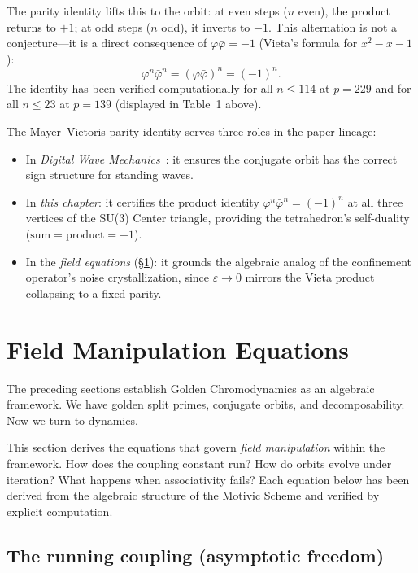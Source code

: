 The parity identity lifts this to the orbit:
at even steps ($n$ even), the product returns to $+1$;
at odd steps ($n$ odd), it inverts to $-1$.
This alternation is not a conjecture---it is a direct consequence
of $\varphi \bar\varphi = -1$ (Vieta's formula for $x^2 - x - 1$):
\[
\varphi^n \bar\varphi^n = (\varphi \bar\varphi)^n = (-1)^n.
\]
The identity has been verified computationally for all $n \leq 114$
at $p = 229$ and for all $n \leq 23$ at $p = 139$
(displayed in Table~1 above).

The Mayer--Vietoris parity identity serves three roles in the
paper lineage:
\begin{itemize}
\item In \emph{Digital Wave Mechanics}~\cite{lockwood_larue_dwm, dwm}: it ensures the
  conjugate orbit has the correct sign structure for standing waves.
\item In \emph{this chapter}: it certifies the product identity
  $\varphi^n \bar\varphi^n = (-1)^n$ at all three vertices of the
  SU(3) Center triangle, providing the tetrahedron's
  self-duality ($\text{sum} = \text{product} = -1$).
\item In the \emph{field equations} (\S\ref{sec:field_equations}):
  it grounds the algebraic analog of the confinement operator's noise
  crystallization, since $\varepsilon \to 0$ mirrors the Vieta product
  collapsing to a fixed parity.
\end{itemize}

\section{Field Manipulation Equations}
\label{sec:field_equations}

The preceding sections establish Golden Chromodynamics as an algebraic framework. We have golden split primes, conjugate orbits, and decomposability. Now we turn to dynamics.

This section derives the equations that govern \emph{field manipulation} within the framework. How does the coupling constant run? How do orbits evolve under iteration? What happens when associativity fails? Each equation below has been derived from the algebraic structure of the Motivic Scheme and verified by explicit computation.

\subsection{The running coupling (asymptotic freedom)}


